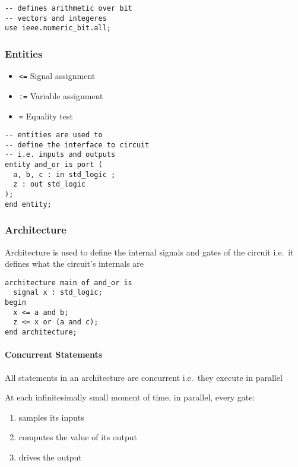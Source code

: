 \documentclass[
]{article}
\providecommand{\tightlist}{%
  \setlength{\itemsep}{0pt}\setlength{\parskip}{0pt}}
\begin{document}
\begin{verbatim}
-- defines arithmetic over bit 
-- vectors and integeres
use ieee.numeric_bit.all;
\end{verbatim}

\hypertarget{entities}{%
\subsubsection{Entities}\label{entities}}

\begin{itemize}
\tightlist
\item
  \texttt{\textless{}=} Signal assignment
\item
  \texttt{:=} Variable assignment
\item
  \texttt{=} Equality test
\end{itemize}

\begin{verbatim}
-- entities are used to
-- define the interface to circuit
-- i.e. inputs and outputs
entity and_or is port (
  a, b, c : in std_logic ;
  z : out std_logic 
);
end entity;
\end{verbatim}

\hypertarget{architecture}{%
\subsubsection{Architecture}\label{architecture}}

Architecture is used to define the internal signals and gates of the circuit i.e.~it defines what the circuit's internals are

\begin{verbatim}
architecture main of and_or is 
  signal x : std_logic;
begin
  x <= a and b; 
  z <= x or (a and c);
end architecture;
\end{verbatim}

\hypertarget{concurrent-statements}{%
\paragraph{Concurrent Statements}\label{concurrent-statements}}

All statements in an architecture are concurrent i.e.~they execute in parallel

At each infinitesimally small moment of time, in parallel, every gate:

\begin{enumerate}
\def\labelenumi{\arabic{enumi}.}
\tightlist
\item
  samples its inputs
\item
  computes the value of its output
\item
  drives the output
\end{enumerate}
\end{document}
